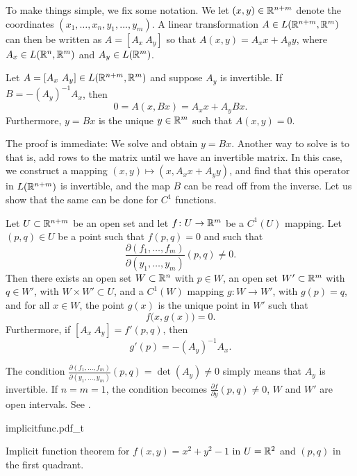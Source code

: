 To make things simple, we fix some notation.  We let $(x,y) \in
{\mathbb{R}}^{n+m}$ denote the coordinates $(x_1,\ldots,x_n,y_1,\ldots,y_m)$.  A
linear transformation $A \in L({\mathbb{R}}^{n+m},{\mathbb{R}}^m)$ can then 
be written as
$A = [ A_x ~ A_y ]$ so that $A(x,y) = A_x x + A_y y$,
where $A_x \in L({\mathbb{R}}^n,{\mathbb{R}}^m)$ and
$A_y \in L({\mathbb{R}}^m)$.

\begin{prop}
Let $A = [A_x~A_y] \in L({\mathbb{R}}^{n+m},{\mathbb{R}}^m)$ and suppose 
$A_y$ is invertible.  If $B = - {(A_y)}^{-1} A_x$, then
\begin{equation*}
0 = A ( x, Bx) = A_x x + A_y Bx .
\end{equation*}
Furthermore, $y=Bx$ is the unique $y \in {\mathbb{R}}^m$ such that $A(x,y) = 0$.
\end{prop}

The proof is immediate: We solve and obtain $y = Bx$.
Another way to solve is to  that is, add
rows to the matrix until we have an invertible matrix.  In this case,
we construct a mapping $(x,y) \mapsto (x,A_x x + A_y y)$, and
find that this operator in $L({\mathbb{R}}^{n+m})$ is invertible, and the map $B$
can be read off from the inverse.
Let us show that the same can be done for $C^1$ functions.

\begin{thm}
\label{thm:implicit}
Let $U \subset {\mathbb{R}}^{n+m}$ be an open set and let $f \colon U \to {\mathbb{R}}^m$
be a $C^1(U)$ mapping.  Let $(p,q) \in U$ be a point such that
$f(p,q) = 0$ and such that
\begin{equation*}
\frac{\partial(f_1,\ldots,f_m)}{\partial(y_1,\ldots,y_m)} (p,q)  \neq 0 .
\end{equation*}
Then there exists an
open set $W \subset {\mathbb{R}}^n$ with $p \in W$,
an open set $W' \subset {\mathbb{R}}^m$ with $q \in W'$,
with $W \times W' \subset U$,
and
a $C^1(W)$ mapping $g \colon W \to W'$, with $g(p) = q$, and
for all $x \in W$, the point $g(x)$ is the unique point in $W'$
such that 
\begin{equation*}
f\bigl(x,g(x)\bigr) = 0 .
\end{equation*}
Furthermore, if $[ A_x ~ A_y ] = f'(p,q)$, then
\begin{equation*}
g'(p) = -{(A_y)}^{-1}A_x .
\end{equation*}
\end{thm}

The condition
$\frac{\partial(f_1,\ldots,f_m)}{\partial(y_1,\ldots,y_m)} (p,q) =
\det(A_y)  \neq 0$
simply means that $A_y$ is invertible.  If $n=m=1$, the condition 
becomes $\frac{\partial f}{\partial y}(p,q) \not= 0$, $W$ and $W'$ are 
open intervals.  See .
\begin{myfigureht}
{implicitfunc.pdf_t}
\caption{Implicit function theorem for $f(x,y) = x^2+y^2-1$ in $U={\mathbb{R}}^2$ and
$(p,q)$ in the first quadrant.\label{fig:implicitfunc}}
\end{myfigureht}

